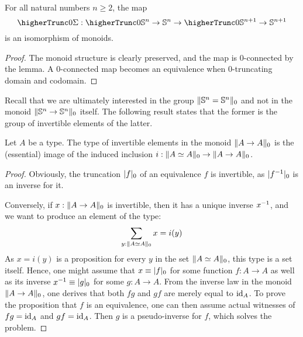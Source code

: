 \documentclass[english,a4paper]{lmcs}
\begin{document}
\begin{cor} \label{cor:higher-spheres-2-comp}
    For all natural numbers $n \geq 2$, the map
    \begin{equation}
    \higherTrunc 0 {\susp} : \higherTrunc 0 {\Sn n \to \Sn n} \to \higherTrunc 0 {\Sn {n+1} \to \Sn {n+1}}
    \end{equation}
    is an isomorphism of monoids.
\end{cor}
\begin{proof}
    The monoid structure is clearly preserved, and the map is $0$-connected by the lemma. A $0$-connected map becomes an equivalence when $0$-truncating domain and codomain.
\end{proof}

Recall that we are ultimately interested in the group $\lVert{\mathbb S^{n}} = {\mathbb S^{n}}\rVert_0$ and not in the monoid $\lVert{\mathbb S^{n}} \to {\mathbb S^{n}}\rVert_0$ itself. The following result states that the former is the group of invertible elements of the latter.
\begin{lem}
    Let $A$ be a type. The type of invertible elements in the monoid $\lVert A \to A\rVert_0$
    is the (essential) image of the induced inclusion $i:\lVert A \simeq A\rVert_0 \to
    \lVert A \to A\rVert_0$.
    \label{lemma:invertible-truncated-Sn-pointed-weq}
\end{lem}
\begin{proof}
    Obviously, the truncation $\lvert f\rvert_0$ of an equivalence $f$ is invertible,
    as $\lvert f^{-1}\rvert_0$ is an inverse for it.

    Conversely, if $x:\lVert A \to A\rVert_0$ is invertible, then
    it has a unique inverse $x^{-1}$, and we want to
    produce an element of the type:
    \begin{displaymath}
    \sum_{y:\lVert A \simeq A\rVert_0} x = i(y)
    \end{displaymath}
    As $x=i(y)$ is a proposition for every $y$ in the set $\lVert A
        \simeq A\rVert_0$, this type is a set itself. Hence, one might assume
    that $x \equiv \lvert f\rvert_0$ for some function $f:A \to A$ as well
    as its inverse $x^{-1} \equiv \lvert g\rvert_0$ for some $g:A \to A$.
    From the inverse law in the monoid $\lVert A \to A\rVert_0$, one
    derives that both $fg$ and $gf$ are merely equal to $\mathord{\mathrm{id}}_{A}$. To prove
    the proposition that $f$ is an equivalence, one can then assume actual
    witnesses of $fg=\mathord{\mathrm{id}}_{A}$ and $gf=\mathord{\mathrm{id}}_{A}$. Then $g$ is a
    pseudo-inverse for $f$, which solves the problem.
\end{proof}
\end{document}
